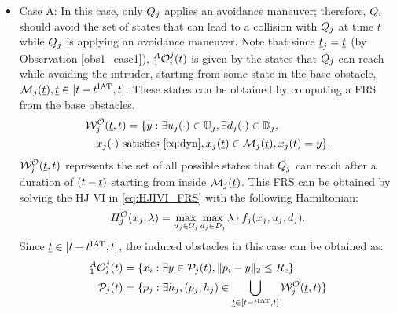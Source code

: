 \begin{itemize}[leftmargin=*] 
\item \label{sec:intruderObs_case1_caseA} Case A: In this case, only $Q_j$ applies an avoidance maneuver; therefore, $Q_i$ should avoid the set of states that can lead to a collision with $Q_j$ at time $t$ while $Q_j$ is applying an avoidance maneuver. Note that since $\underline{t}_j = \underline{t}$ (by Observation \ref{obs1_case1}), $_1^A\mathcal{O}_i^j(t)$ is given by the states that $Q_j$ can reach while avoiding the intruder, starting from some state in the base obstacle, $\mathcal{M}_j(\underline{t}), \underline{t} \in [t-t^\text{IAT}, t]$. These states can be obtained by computing a FRS from the base obstacles.
\begin{equation} \label{eq:ObsFRS_case1_caseA}
\begin{aligned}
& \frs_{j}^{\mathcal{O}}(\tsa, t) = \{y: \exists \ctrl_j(\cdot) \in \cfset_j, \exists \dstb_j(\cdot) \in \dfset_j, \\
& \quad \state_j(\cdot) \text{ satisfies \eqref{eq:dyn}}, \state_j(\tsa) \in \boset_j(\tsa), \state_j(t) = y\}.
\end{aligned}
\end{equation}
$\mathcal{W}_{j}^{\mathcal{O}}(\underline{t}, t)$ represents the set of all possible states that $Q_j$ can reach after a duration of $(t-\underline{t})$ starting from inside $\mathcal{M}_j(\underline{t})$. This FRS can be obtained by solving the HJ VI in \eqref{eq:HJIVI_FRS} with the following Hamiltonian:
\begin{equation}
H_{j}^{\mathcal{O}}(x_j, \lambda) = \max_{u_j \in \mathcal{U}_j} \max_{d_j \in \mathcal{D}_j} \lambda \cdot f_j (x_j, u_j, d_j).
\end{equation} 
Since $\underline{t} \in [t-t^\text{IAT}, t]$, the induced obstacles in this case can be obtained as:
\begin{equation} \label{eq:intruderObs_case1_caseA} 
\begin{aligned}
_1^A\ioset_i^j(t) & = \{\state_i: \exists y \in \pfrs_j(t), \|\pos_i - y\|_2 \le \rc \}\\
\pfrs_j(t) & = \{p_j: \exists \npos_j, (p_j, \npos_j) \in \bigcup_{\tsa \in [t-\iat, t]} \frs_{j}^{\mathcal{O}}(\tsa, t) \}
\end{aligned}
\end{equation}


\end{itemize}
